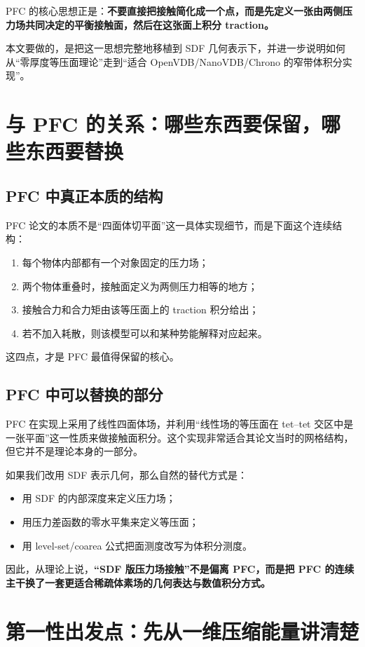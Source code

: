 \documentclass[12pt,a4paper]{ctexart}
\begin{document}
PFC 的核心思想正是：\textbf{不要直接把接触简化成一个点，而是先定义一张由两侧压力场共同决定的平衡接触面，然后在这张面上积分 traction。}

本文要做的，是把这一思想完整地移植到 SDF 几何表示下，并进一步说明如何从“零厚度等压面理论”走到“适合 OpenVDB/NanoVDB/Chrono 的窄带体积分实现”。

\section{与 PFC 的关系：哪些东西要保留，哪些东西要替换}

\subsection{PFC 中真正本质的结构}
PFC 论文的本质不是“四面体切平面”这一具体实现细节，而是下面这个连续结构：
\begin{enumerate}
    \item 每个物体内部都有一个对象固定的压力场；
    \item 两个物体重叠时，接触面定义为两侧压力相等的地方；
    \item 接触合力和合力矩由该等压面上的 traction 积分给出；
    \item 若不加入耗散，则该模型可以和某种势能解释对应起来。
\end{enumerate}

这四点，才是 PFC 最值得保留的核心。

\subsection{PFC 中可以替换的部分}
PFC 在实现上采用了线性四面体场，并利用“线性场的等压面在 tet--tet 交区中是一张平面”这一性质来做接触面积分。这个实现非常适合其论文当时的网格结构，但它并不是理论本身的一部分。

如果我们改用 SDF 表示几何，那么自然的替代方式是：
\begin{itemize}
    \item 用 SDF 的内部深度来定义压力场；
    \item 用压力差函数的零水平集来定义等压面；
    \item 用 level-set/coarea 公式把面测度改写为体积分测度。
\end{itemize}

因此，从理论上说，\textbf{“SDF 版压力场接触”不是偏离 PFC，而是把 PFC 的连续主干换了一套更适合稀疏体素场的几何表达与数值积分方式。}

\section{第一性出发点：先从一维压缩能量讲清楚}
\end{document}
